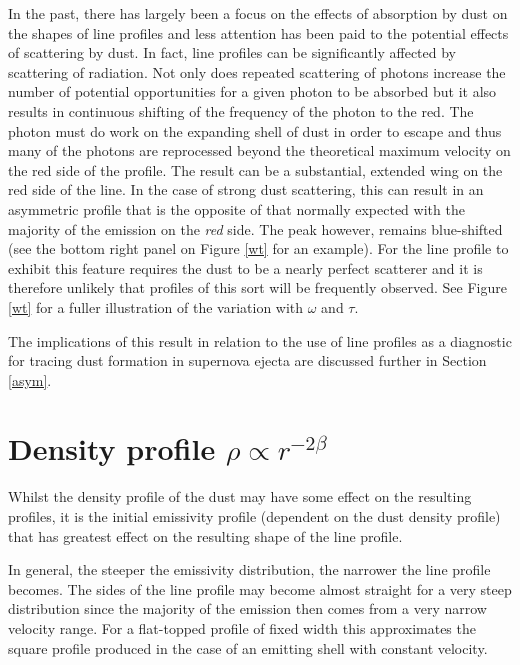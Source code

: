 In the past, there has largely been a focus on the effects of absorption by dust 
on the shapes of line profiles and less attention has been paid to the 
potential effects of scattering by dust.  In fact, line profiles 
can be significantly affected by scattering of radiation.  Not only does 
repeated scattering of photons increase the number of potential 
opportunities for a given photon to be absorbed but it also results in 
continuous shifting of the frequency of the photon to the red.  The photon 
must do work on the expanding shell of dust in order to escape and thus 
many of the photons are reprocessed beyond the theoretical maximum 
velocity on the red side of the profile.  The result can be a substantial, 
extended wing on the red side of the line.  In the case of strong 
dust scattering, this can result in an asymmetric profile that is the opposite 
of that normally expected with the majority of the emission on the 
\textit{red} side.  The peak however, remains blue-shifted (see the bottom right panel on Figure \ref{wt} for an example).  
For the line profile to exhibit this feature requires the dust to be a 
nearly perfect scatterer and it is therefore unlikely that profiles of this sort will be
frequently observed.  See Figure \ref{wt} for a fuller illustration of the variation
with $\omega$ and $\tau$.

The implications of this result in relation to the use of line profiles as 
a diagnostic for tracing dust formation in supernova ejecta 
are discussed further in Section \ref{asym}.


\section{Density profile $\rho \propto r^{-2\beta}$}
\label{beta}

Whilst the density profile of the dust may have some effect on the 
resulting profiles, it is the initial emissivity profile (dependent on the 
dust density profile) that has greatest effect on the resulting shape of 
the line profile.

In general, the steeper the emissivity distribution, the narrower the line 
profile becomes.  The sides of the line profile may become almost straight 
for a very steep distribution since the majority of the emission then 
comes from a very narrow velocity range.  For a flat-topped profile of 
fixed width this approximates the square profile produced in the case of 
an emitting shell with constant velocity.

